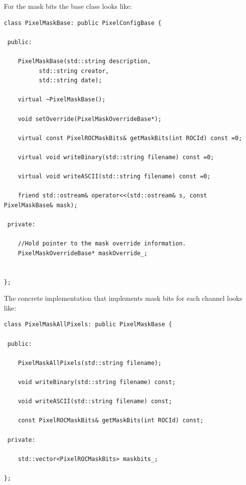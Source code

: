 For the mask bits the base class looks like:

\begin{verbatim}
class PixelMaskBase: public PixelConfigBase {

 public:

    PixelMaskBase(std::string description, 
		  std::string creator,
		  std::string date);

    virtual ~PixelMaskBase();

    void setOverride(PixelMaskOverrideBase*);

    virtual const PixelROCMaskBits& getMaskBits(int ROCId) const =0;

    virtual void writeBinary(std::string filename) const =0;

    virtual void writeASCII(std::string filename) const =0;

    friend std::ostream& operator<<(std::ostream& s, const PixelMaskBase& mask);

 private:

    //Hold pointer to the mask override information.
    PixelMaskOverrideBase* maskOverride_;


};
\end{verbatim}

The concrete implementation that implements mask bits for each
channel looks like:

\begin{verbatim}
class PixelMaskAllPixels: public PixelMaskBase {

 public:

    PixelMaskAllPixels(std::string filename);

    void writeBinary(std::string filename) const;

    void writeASCII(std::string filename) const;

    const PixelROCMaskBits& getMaskBits(int ROCId) const;

 private:

    std::vector<PixelROCMaskBits> maskbits_;  
 
};

\end{verbatim}

